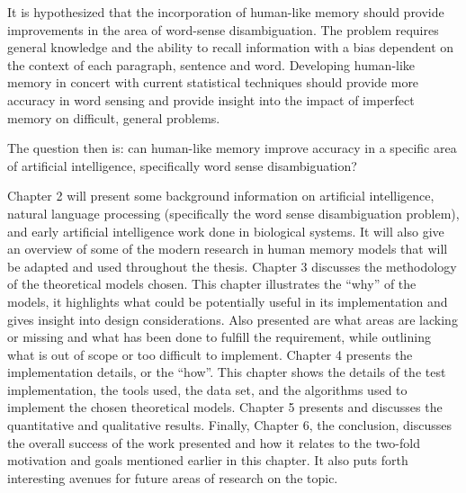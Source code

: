 It is hypothesized that the incorporation of human-like memory should provide
improvements in the area of word-sense disambiguation. The problem requires
general knowledge and the ability to recall information with a bias dependent on
the context of each paragraph, sentence and word.  Developing human-like memory
in concert with current statistical techniques should provide more accuracy in
word sensing and provide insight into the impact of imperfect memory on
difficult, general problems.

The question then is: can human-like memory improve accuracy in a specific area
of artificial intelligence, specifically word sense disambiguation?

Chapter 2 will present some background information on artificial intelligence,
natural language processing (specifically the word sense disambiguation
problem), and early artificial intelligence work done in biological systems. It
will also give an overview of some of the modern research in human memory models
that will be adapted and used throughout the thesis.  Chapter 3 discusses the
methodology of the theoretical models chosen. This chapter illustrates the
``why'' of the models, it highlights what could be potentially useful in its
implementation and gives insight into design considerations.  Also presented are
what areas are lacking or missing and what has been done to fulfill the
requirement, while outlining what is out of scope or too difficult to implement.
Chapter 4 presents the implementation details, or the ``how''.  This chapter
shows the details of the test implementation, the tools used, the data set, and
the algorithms used to implement the chosen theoretical models.  Chapter 5
presents and discusses the quantitative and qualitative results. Finally,
Chapter 6, the conclusion, discusses the overall success of the work presented and
how it relates to the two-fold motivation and goals mentioned earlier in this
chapter. It also puts forth interesting avenues for future areas of research on
the topic.
